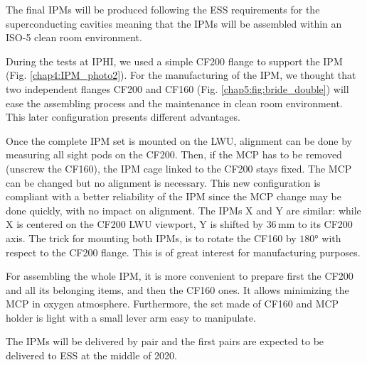 The final IPMs will be produced following the ESS requirements for the superconducting cavities meaning that the IPMs will be assembled within an ISO-5 clean room environment.

During the tests at IPHI, we used a simple CF200 flange to support the IPM (Fig. \ref{chap4:IPM_photo2}). For the manufacturing of the IPM, we thought that two independent flanges CF200 and CF160 (Fig. \ref{chap5:fig:bride_double}) will ease the assembling process and the maintenance in clean room environment. This later configuration presents different advantages.



Once the complete IPM set is mounted on the LWU, alignment can be done by measuring all sight pods on the CF200. Then, if the MCP has to be removed (unscrew the CF160), the IPM cage linked to the CF200 stays fixed. The MCP can be changed but no alignment is necessary. This new configuration is compliant with a better reliability of the IPM since the MCP change may be done quickly, with no impact on alignment. The IPMs X and Y are similar: while X is centered on the CF200 LWU viewport, Y is shifted by $36\,\mathrm{mm}$ to its CF200 axis. The trick for mounting both IPMs, is to rotate the CF160 by $180°$ with respect to the CF200 flange. This is of great interest for manufacturing purposes.

For assembling the whole IPM, it is more convenient to prepare first the CF200 and all its belonging items, and then the CF160 ones. It allows minimizing the MCP in oxygen atmosphere. Furthermore, the set made of CF160 and MCP holder is light with a small lever arm easy to manipulate.

The IPMs will be delivered by pair and the first pairs are expected to be delivered to ESS at the middle of 2020.



